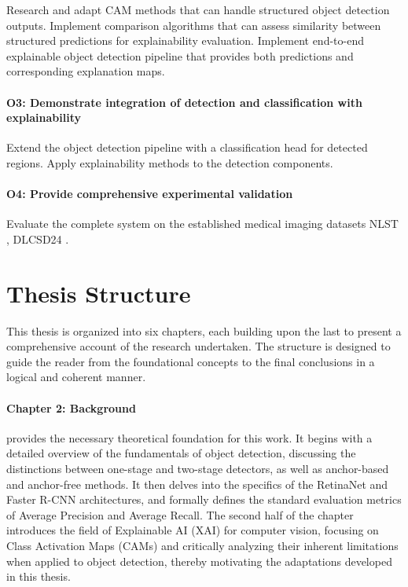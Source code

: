 Research and adapt CAM methods that can handle structured object detection outputs.
Implement comparison algorithms that can assess similarity between structured predictions for explainability evaluation.
Implement end-to-end explainable object detection pipeline that provides both predictions and corresponding explanation maps.

\paragraph{O3: Demonstrate integration of detection and classification with explainability}

Extend the object detection pipeline with a classification head for detected regions.
Apply explainability methods to the detection components.

\paragraph{O4: Provide comprehensive experimental validation}
Evaluate the complete system on the established medical imaging datasets NLST \cite{nlst_data}, DLCSD24 \cite{tushar2025ailunghealthbenchmarking}.

\section{Thesis Structure}
\label{sec:thesis_structure}

This thesis is organized into six chapters, each building upon the last to present a comprehensive account of the research undertaken. The structure is designed to guide the reader from the foundational concepts to the final conclusions in a logical and coherent manner.

\paragraph{Chapter 2: Background} provides the necessary theoretical foundation for this work. It begins with a detailed overview of the fundamentals of object detection, discussing the distinctions between one-stage and two-stage detectors, as well as anchor-based and anchor-free methods. It then delves into the specifics of the RetinaNet and Faster R-CNN architectures, and formally defines the standard evaluation metrics of Average Precision and Average Recall. The second half of the chapter introduces the field of Explainable AI (XAI) for computer vision, focusing on Class Activation Maps (CAMs) and critically analyzing their inherent limitations when applied to object detection, thereby motivating the adaptations developed in this thesis.

